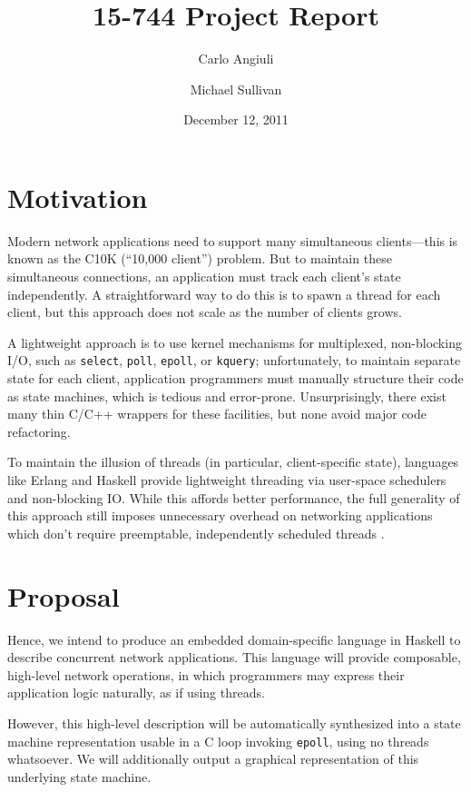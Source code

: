 \documentclass{article}
\title{15-744 Project Report}
\author{Carlo Angiuli \and Michael Sullivan}
\date{December 12, 2011}
\renewcommand{\t}{\texttt}
\begin{document}
\maketitle

\section{Motivation}

Modern network applications need to support many simultaneous clients---this is
known as the C10K (``10,000 client'') problem\cite{Kegel}. But to maintain these
simultaneous connections, an application must track each client's state
independently. A straightforward way to do this is to spawn a thread for each
client, but this approach does not scale as the number of clients grows. 

A lightweight approach is to use kernel mechanisms for multiplexed, non-blocking
I/O, such as \t{select}, \t{poll}, \t{epoll}, or \t{kquery}; unfortunately, to
maintain separate state for each client, application programmers must manually
structure their code as state machines, which is tedious and error-prone.
Unsurprisingly, there exist many thin C/C++ wrappers for these facilities, but
none avoid major code refactoring.

To maintain the illusion of threads (in particular, client-specific state),
languages like Erlang and Haskell provide lightweight threading via user-space
schedulers and non-blocking IO. While this affords better performance, the full
generality of this approach still imposes unnecessary overhead on networking
applications which don't require preemptable, independently scheduled threads
\cite{Vinoski}.

\section{Proposal}

Hence, we intend to produce an embedded domain-specific language in Haskell to
describe concurrent network applications. This language will provide composable,
high-level network operations, in which programmers may express their
application logic naturally, as if using threads. 

However, this high-level description will be automatically synthesized into a
state machine representation usable in a C loop invoking \t{epoll}, using no
threads whatsoever. We will additionally output a graphical representation of
this underlying state machine.
\end{document}
